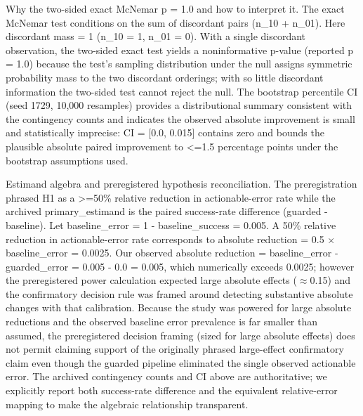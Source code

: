 \documentclass[conference]{IEEEtran}
\begin{document}
Why the two-sided exact McNemar p = 1.0 and how to interpret it. The exact McNemar test conditions on the sum of discordant pairs (n\_10 + n\_01). Here discordant mass = 1 (n\_10 = 1, n\_01 = 0). With a single discordant observation, the two-sided exact test yields a noninformative p-value (reported p = 1.0) because the test's sampling distribution under the null assigns symmetric probability mass to the two discordant orderings; with so little discordant information the two-sided test cannot reject the null. The bootstrap percentile CI (seed 1729, 10,000 resamples) provides a distributional summary consistent with the contingency counts and indicates the observed absolute improvement is small and statistically imprecise: CI = [0.0, 0.015] contains zero and bounds the plausible absolute paired improvement to <=1.5 percentage points under the bootstrap assumptions used.

Estimand algebra and preregistered hypothesis reconciliation. The preregistration phrased H1 as a >=50\% relative reduction in actionable-error rate while the archived primary\_estimand is the paired success-rate difference (guarded - baseline). Let baseline\_error = 1 - baseline\_success = 0.005. A 50\% relative reduction in actionable-error rate corresponds to absolute reduction = 0.5 \ensuremath{\times} baseline\_error = 0.0025. Our observed absolute reduction = baseline\_error - guarded\_error = 0.005 - 0.0 = 0.005, which numerically exceeds 0.0025; however the preregistered power calculation expected large absolute effects (\ensuremath{\approx}0.15) and the confirmatory decision rule was framed around detecting substantive absolute changes with that calibration. Because the study was powered for large absolute reductions and the observed baseline error prevalence is far smaller than assumed, the preregistered decision framing (sized for large absolute effects) does not permit claiming support of the originally phrased large-effect confirmatory claim even though the guarded pipeline eliminated the single observed actionable error. The archived contingency counts and CI above are authoritative; we explicitly report both success-rate difference and the equivalent relative-error mapping to make the algebraic relationship transparent.
\end{document}
